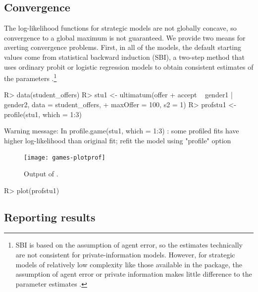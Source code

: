 \documentclass[article]{jss}
\begin{document}
\subsection{Convergence}

The log-likelihood functions for strategic models are not globally concave, so
convergence to a global maximum is not guaranteed.  We provide two means for
averting convergence problems.  First, in all of the  models, the
default starting values come from statistical backward induction (SBI), a
two-step method that uses ordinary probit or logistic regression models to
obtain consistent estimates of the parameters \citep{Bas2007}.\footnote{SBI is
  based on the assumption of agent error, so the estimates technically are not
  consistent for private-information models.  However, for strategic models of
  relatively low complexity like those available in the  package, the
  assumption of agent error or private information makes little difference to
  the parameter estimates \citep{Signorino2003}.}


\begin{Schunk}
\begin{Sinput}
R> data(student_offers)
R> stu1 <- ultimatum(offer + accept ~ gender1 | gender2, data = student_offers, 
+     maxOffer = 100, s2 = 1)
R> profstu1 <- profile(stu1, which = 1:3)
\end{Sinput}
\end{Schunk}
\begin{Code}  
Warning message:
In profile.game(stu1, which = 1:3) :
  some profiled fits have higher log-likelihood than original fit;
  refit the model using "profile" option
\end{Code}

\begin{figure}[t]
  \centering
\texttt{[image: games-plotprof]}
\caption{Output of .}
\label{fig:plot-profile}
\end{figure}

\begin{Schunk}
\begin{Sinput}
R> plot(profstu1)
\end{Sinput}
\end{Schunk}

\subsection{Reporting results}
\label{sec:report}
\end{document}
